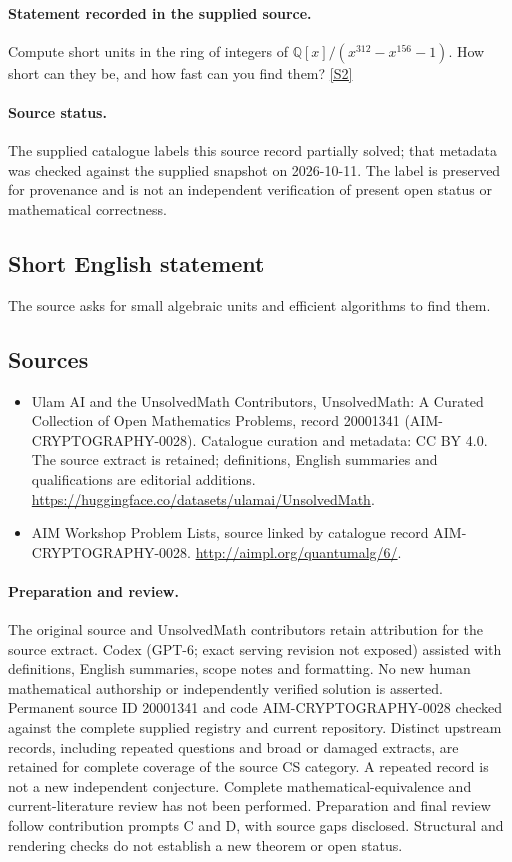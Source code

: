 \documentclass[11pt]{article}
\begin{document}
\paragraph{Statement recorded in the supplied source.}
Compute short units in the ring of integers of $\mathbb Q[x]/(x^{312} - x^{156} -1)$. How short can they be, and how fast can you find them? \href{http://aimpl.org/quantumalg/6/}{[S2]}
\paragraph{Source status.}
The supplied catalogue labels this source record partially solved; that metadata was checked against the supplied snapshot on 2026-10-11. The label is preserved for provenance and is not an independent verification of present open status or mathematical correctness.
\subsection{Short English statement}
The source asks for small algebraic units and efficient algorithms to find them.
\subsection{Sources}
\begin{itemize}
\item[S1] Ulam AI and the UnsolvedMath Contributors, UnsolvedMath: A Curated Collection of Open Mathematics Problems, record 20001341 (AIM-CRYPTOGRAPHY-0028). Catalogue curation and metadata: CC BY 4.0. The source extract is retained; definitions, English summaries and qualifications are editorial additions.
\url{https://huggingface.co/datasets/ulamai/UnsolvedMath}.
\item[S2] AIM Workshop Problem Lists, source linked by catalogue record AIM-CRYPTOGRAPHY-0028.
\url{http://aimpl.org/quantumalg/6/}.
\end{itemize}
\paragraph{Preparation and review.}
The original source and UnsolvedMath contributors retain attribution for the source extract. Codex (GPT-6; exact serving revision not exposed) assisted with definitions, English summaries, scope notes and formatting. No new human mathematical authorship or independently verified solution is asserted. Permanent source ID 20001341 and code AIM-CRYPTOGRAPHY-0028 checked against the complete supplied registry and current repository. Distinct upstream records, including repeated questions and broad or damaged extracts, are retained for complete coverage of the source CS category. A repeated record is not a new independent conjecture. Complete mathematical-equivalence and current-literature review has not been performed. Preparation and final review follow contribution prompts C and D, with source gaps disclosed. Structural and rendering checks do not establish a new theorem or open status.
\label{end:20001341}
\end{document}
